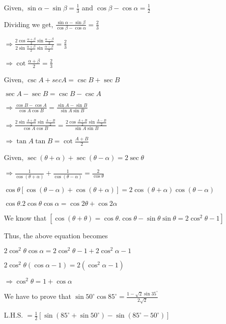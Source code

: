 \item Given, $\sin\alpha - \sin\beta = \frac{1}{3}$ and $\cos\beta - \cos\alpha = \frac{1}{2}$

  Dividing we get, $\frac{\sin\alpha - \sin\beta}{\cos\beta - \cos\alpha} = \frac{2}{3}$

  $\Rightarrow \frac{2\cos\frac{\alpha + \beta}{2}\sin\frac{\alpha - \beta}{2}}{2\sin\frac{\alpha +
      \beta}{2}\sin\frac{\alpha - \beta}{2}} = \frac{2}{3}$

  $\Rightarrow \cot\frac{\alpha + \beta}{2} = \frac{2}{3}$

\item Given, $\csc A + sec A = \csc B + \sec B$

  $\sec A - \sec B = \csc B - \csc A$

  $\Rightarrow \frac{\cos B - \cos A}{\cos A\cos B} = \frac{\sin A - \sin B}{\sin A\sin B}$

  $\Rightarrow \frac{2\sin\frac{A + B}{2}\sin \frac{A - B}{2}}{\cos A\cos B} = \frac{2\cos\frac{A + B}{2}\sin\frac{A -
    B}{2}}{\sin A\sin B}$

  $\Rightarrow \tan A\tan B = \cot \frac{A + B}{2}$

\item Given, $\sec(\theta + \alpha) + \sec(\theta - \alpha) = 2\sec\theta$

  $\Rightarrow \frac{1}{\cos(\theta + \alpha)} + \frac{1}{\cos(\theta - \alpha)} = \frac{2}{\cos\theta}$

  $\cos\theta[\cos(\theta - \alpha) + \cos(\theta + \alpha)] = 2\cos(\theta + \alpha)\cos(\theta - \alpha)$

  $\cos\theta.2\cos\theta\cos\alpha = \cos2\theta + \cos2\alpha$

  We know that $[\cos(\theta + \theta) = \cos\theta.\cos\theta - \sin\theta\sin\theta = 2\cos^2\theta - 1]$

  Thus, the above equation becomes

  $2\cos^2\theta\cos\alpha = 2\cos^2\theta - 1 + 2\cos^2\alpha - 1$

  $2\cos^2\theta(\cos\alpha - 1) = 2(\cos^2\alpha - 1)$

  $\Rightarrow \cos^2\theta = 1 + \cos\alpha$

\item We have to prove that $\sin50^\circ\cos85^\circ = \frac{1 - \sqrt{2}\sin 35^\circ}{2\sqrt{2}}$

  L.H.S. $= \frac{1}{2}[\sin(85^\circ + \sin50^\circ) - \sin(85^\circ - 50^\circ)]$

